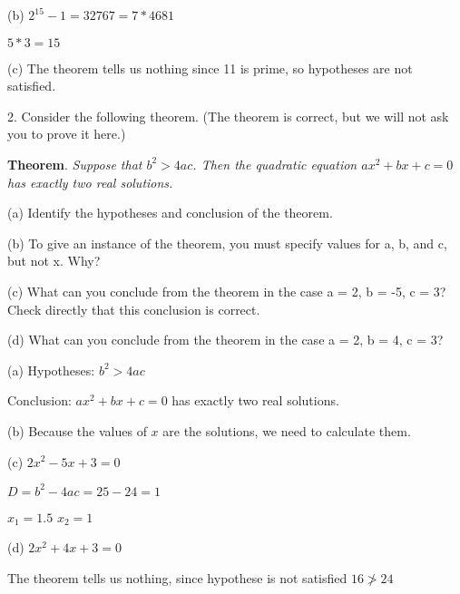 \documentclass{article}
\begin{document}
(b) $2^{15}-1 = 32767 = 7*4681$

$5*3 = 15$

\vspace{20pt}

(c) The theorem tells us nothing since 11 is prime, so hypotheses are not satisfied.

\vspace{30pt}

2. Consider the following theorem. (The theorem is correct, but we will not
ask you to prove it here.)

\textbf{Theorem}. \textit{Suppose that $b^2 > 4ac$. Then the quadratic equation $ax^2 +
bx + c = 0$ has exactly two real solutions.}

\hspace{12pt}(a) Identify the hypotheses and conclusion of the theorem.

\hspace{12pt}(b) To give an instance of the theorem, you must specify values for a, b,
and c, but not x. Why?

\hspace{12pt}(c) What can you conclude from the theorem in the case a = 2, b = -5,
c = 3? Check directly that this conclusion is correct.

\hspace{12pt}(d) What can you conclude from the theorem in the case a = 2, b = 4,
c = 3?

\vspace{20pt}

(a) Hypotheses: $b^2 > 4ac$

Conclusion: $ax^2 + bx + c = 0$ has exactly two real solutions.

\vspace{20pt}

(b) Because the values of $x$ are the solutions, we need to calculate them.

\vspace{20pt}

(c) $2x^2 - 5x + 3 = 0$

$D = b^2 - 4ac = 25 - 24 = 1$

$x_1 = 1.5$ $x_2 = 1$

\vspace{20pt}

(d) $2x^2 + 4x + 3 = 0$

The theorem tells us nothing, since hypothese is not satisfied $16 \ngtr 24$


\vspace{30pt}
\end{document}
